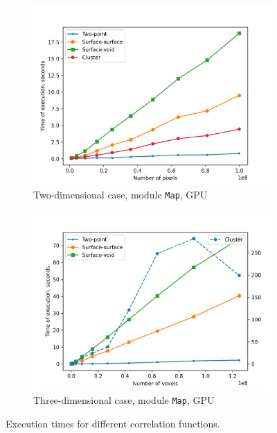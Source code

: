 \documentclass[reprint,amsmath,amssymb,aps,pre]{revtex4-1}
\newcommand{\code}[1]{\colorbox{light-gray}{\texttt{#1}}}
\begin{document}
\begin{figure}[t]
\begin{subfigure}[b]{0.475\textwidth}
    \centering
    \includegraphics[width=\textwidth]{images/time-2d-gpu.png}
    \caption[]{{\small Two-dimensional case, module \code{Map}, GPU}}
    \label{fig:timings-2d-gpu}
  \end{subfigure}
  \hfill
  \begin{subfigure}[b]{0.475\textwidth}
    \centering
    \includegraphics[width=\textwidth]{images/time-3d-gpu.png}
    \caption[]{{\small Three-dimensional case, module \code{Map}, GPU}}
    \label{fig:timings-3d-gpu}
  \end{subfigure}
  \caption[]{\small Execution times for different correlation functions.}
  \label{fig:timings}
\end{figure}
\twocolumngrid
\end{document}
